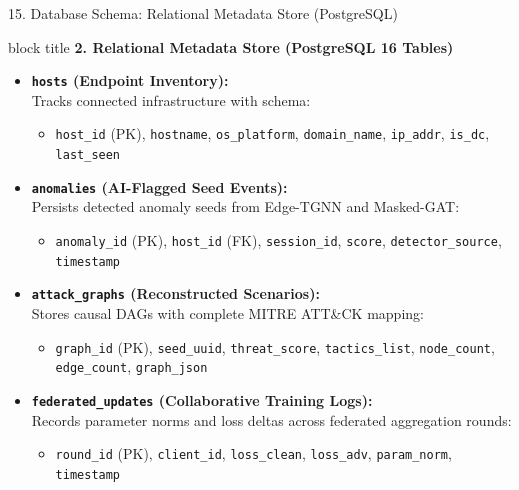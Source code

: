 \documentclass[aspectratio=169,10pt]{beamer}
\begin{document}
\begin{frame}{15. Database Schema: Relational Metadata Store (PostgreSQL)}
\vspace{0.3em}
\begin{beamercolorbox}[rounded=true,shadow=false,sep=0.45em,wd=\textwidth]{block title}
\textbf{\scriptsize 2. Relational Metadata Store (PostgreSQL 16 Tables)}
\end{beamercolorbox}
\vspace{0.3em}
{\fontsize{7.8pt}{11.5pt}\selectfont
\begin{itemize}\itemsep0.45em
  \item \textbf{\texttt{hosts} (Endpoint Inventory):}\\
  Tracks connected infrastructure with schema:
  \begin{itemize}\itemsep0.15em
    \item \texttt{host\_id} (PK), \texttt{hostname}, \texttt{os\_platform}, \texttt{domain\_name}, \texttt{ip\_addr}, \texttt{is\_dc}, \texttt{last\_seen}
  \end{itemize}
  \item \textbf{\texttt{anomalies} (AI-Flagged Seed Events):}\\
  Persists detected anomaly seeds from Edge-TGNN and Masked-GAT:
  \begin{itemize}\itemsep0.15em
    \item \texttt{anomaly\_id} (PK), \texttt{host\_id} (FK), \texttt{session\_id}, \texttt{score}, \texttt{detector\_source}, \texttt{timestamp}
  \end{itemize}
  \item \textbf{\texttt{attack\_graphs} (Reconstructed Scenarios):}\\
  Stores causal DAGs with complete MITRE ATT\&CK mapping:
  \begin{itemize}\itemsep0.15em
    \item \texttt{graph\_id} (PK), \texttt{seed\_uuid}, \texttt{threat\_score}, \texttt{tactics\_list}, \texttt{node\_count}, \texttt{edge\_count}, \texttt{graph\_json}
  \end{itemize}
  \item \textbf{\texttt{federated\_updates} (Collaborative Training Logs):}\\
  Records parameter norms and loss deltas across federated aggregation rounds:
  \begin{itemize}\itemsep0.15em
    \item \texttt{round\_id} (PK), \texttt{client\_id}, \texttt{loss\_clean}, \texttt{loss\_adv}, \texttt{param\_norm}, \texttt{timestamp}
  \end{itemize}
\end{itemize}
}
\end{frame}
\end{document}
